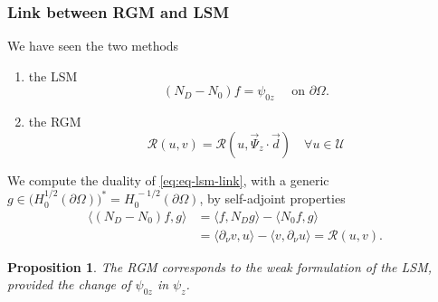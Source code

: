 \documentclass[10pt]{beamer}
\newtheorem{proposition}[subsection]{Proposition}
\theoremstyle{plain}
\theoremstyle{plain}
\begin{document}
\begin{frame}
 \frametitle{Link between RGM and LSM}
 We have seen the two methods
 \begin{enumerate}
  \item the LSM
  \vspace{-0.1cm}
  \begin{equation}
  \label{eq:eq-lsm-link}
  ({N_D} - {N_0})f = \psi_{0z} \quad \text{ on }\partial \Omega.
  \end{equation}
  \item the RGM
  \vspace{-0.1cm}
  \begin{equation}
   \mathcal{R}(u, v) = \mathcal{R}(u, \vec{\Psi}_z\cdot\vec{d})\quad \forall u \in \mathcal{U}
  \end{equation}
 \end{enumerate}
% 
We compute the duality of \eqref{eq:eq-lsm-link}, with a generic 
${g \in \bigl(H^{1/2}_0(\partial \Omega)\bigr)^* = H^{\,-1/2}_0(\partial \Omega)}$, by self-adjoint properties
\begin{align*}
 \label{eq:link-duality-left}
 \langle({N_D} - {N_0})f,g\rangle & =  \langle f,{N_D} g\rangle - \langle {N_0} f,g\rangle \\
                                        & = \langle \partial_\nu v,u\rangle - \langle v,\partial_\nu u\rangle
                                        = \mathcal{R}(u,v).
\end{align*}
\begin{proposition}
 The RGM corresponds to the weak formulation of the LSM,
 provided the change of $\psi_{0z}$ in $\psi_z$.
\end{proposition}
\end{frame}
\end{document}
